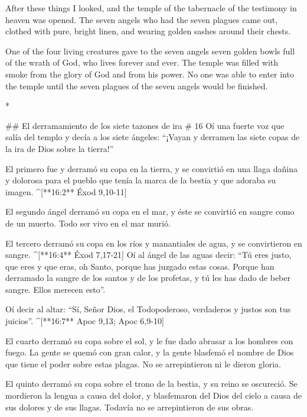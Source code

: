 \begin{paracols}{2}
\begin{english}
 After these things I looked, and the temple of the tabernacle of the testimony in heaven was opened.  The seven angels who had the seven plagues came out, clothed with pure, bright linen, and wearing golden sashes around their chests. 

 One of the four living creatures gave to the seven angels seven golden bowls full of the wrath of God, who lives forever and ever.  The temple was filled with smoke from the glory of God and from his power. No one was able to enter into the temple until the seven plagues of the seven angels would be finished. 

\end{english}
\switchcolumn[0]*

## El derramamiento de los siete tazones de ira
# 16
 Oí una fuerte voz que salía del templo y decía a los siete ángeles: “¡Vayan y derramen las siete copas de la ira de Dios sobre la tierra!”

 El primero fue y derramó su copa en la tierra, y se convirtió en una llaga dañina y dolorosa para el pueblo que tenía la marca de la bestia y que adoraba su imagen. ^[**16:2** Éxod 9,10-11]

 El segundo ángel derramó su copa en el mar, y éste se convirtió en sangre como de un muerto. Todo ser vivo en el mar murió.

 El tercero derramó su copa en los ríos y manantiales de agua, y se convirtieron en sangre. ^[**16:4** Éxod 7,17-21]  Oí al ángel de las aguas decir: “Tú eres justo, que eres y que eras, oh Santo, porque has juzgado estas cosas.  Porque han derramado la sangre de los santos y de los profetas, y tú les has dado de beber sangre. Ellos merecen esto”.

 Oí decir al altar: “Sí, Señor Dios, el Todopoderoso, verdaderos y justos son tus juicios”. ^[**16:7** Apoc 9,13; Apoc 6,9-10]

 El cuarto derramó su copa sobre el sol, y le fue dado abrasar a los hombres con fuego.  La gente se quemó con gran calor, y la gente blasfemó el nombre de Dios que tiene el poder sobre estas plagas. No se arrepintieron ni le dieron gloria.

 El quinto derramó su copa sobre el trono de la bestia, y su reino se oscureció. Se mordieron la lengua a causa del dolor,  y blasfemaron del Dios del cielo a causa de sus dolores y de sus llagas. Todavía no se arrepintieron de sus obras.


\end{paracols}
